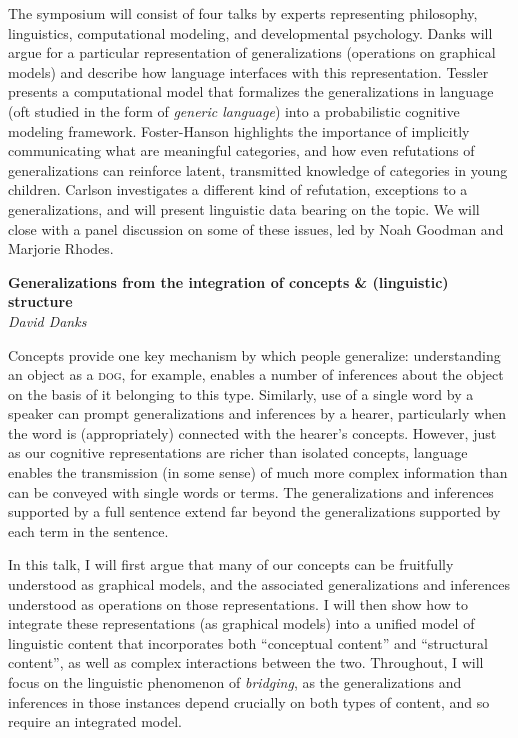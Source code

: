 \documentclass[10pt,letterpaper]{article}
\begin{document}
The symposium will consist of four talks by experts representing philosophy, linguistics, computational modeling, and developmental psychology.    
Danks will argue for a particular representation of generalizations (operations on graphical models) and describe how language interfaces with this representation.
 Tessler presents a computational model that formalizes the generalizations in language (oft studied in the form of \emph{generic language}) into a probabilistic cognitive modeling framework.
 Foster-Hanson highlights the importance of implicitly communicating what are meaningful categories, and how even refutations of generalizations can reinforce latent, transmitted knowledge of categories in young children.
 Carlson investigates a different kind of refutation, exceptions to a generalizations, and will present linguistic data bearing on the topic.
We will close with a panel discussion on some of these issues, led by Noah Goodman and Marjorie Rhodes.



\noindent\textbf{Generalizations from the integration of concepts \& (linguistic) structure}  \\
\noindent\emph{David Danks}

Concepts provide one key mechanism by which people generalize: understanding an object as a \textsc{dog}, for example, enables a number of inferences about the object on the basis of it belonging to this type. 
Similarly, use of a single word by a speaker can prompt generalizations and inferences by a hearer, particularly when the word is (appropriately) connected with the hearer's concepts. 
However, just as our cognitive representations are richer than isolated concepts, language enables the transmission (in some sense) of much more complex information than can be conveyed with single words or terms. 
The generalizations and inferences supported by a full sentence extend far beyond the generalizations supported by each term in the sentence. 

In this talk, I will first argue that many of our concepts can be fruitfully understood as graphical models, and the associated generalizations and inferences understood as operations on those representations. 
I will then show how to integrate these representations (as graphical models) into a unified model of linguistic content that incorporates both ``conceptual content'' and ``structural content'', as well as complex interactions between the two. 
Throughout, I will focus on the linguistic phenomenon of \emph{bridging}, as the generalizations and inferences in those instances depend crucially on both types of content, and so require an integrated model.
\end{document}
